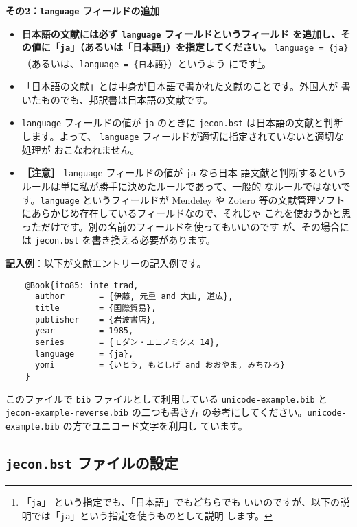 \documentclass[a4paper,10pt]{bxjsarticle}
\begin{document}
\textbf{その2：\texttt{language} フィールドの追加}
\begin{itemize}
 \item \textbf{日本語の文献には必ず \texttt{language} フィールドというフィールド
       を追加し、その値に「\texttt{ja}」（あるいは「日本語」）を指定してください。}
       \verb|language = {ja}| （あるいは、\verb|language = {日本語}|）というよう
       にです\footnote{「\texttt{ja}」 という指定でも、「日本語」でもどちらでも
       いいのですが、以下の説明では「\texttt{ja}」という指定を使うものとして説明
       します。}。
 \item 「日本語の文献」とは中身が日本語で書かれた文献のことです。外国人が
       書いたものでも、邦訳書は日本語の文献です。
 \item \texttt{language} フィールドの値が \texttt{ja} のときに
       \texttt{jecon.bst} は日本語の文献と判断します。よって、
       \texttt{language} フィールドが適切に指定されていないと適切な処理が
       おこなわれません。
 \item \textbf{［注意］} \texttt{language} フィールドの値が \texttt{ja} なら日本
       語文献と判断するというルールは単に私が勝手に決めたルールであって、一般的
       なルールではないです。\texttt{language} というフィールドが Mendeley や
       Zotero 等の文献管理ソフトにあらかじめ存在しているフィールドなので、それじゃ
       これを使おうかと思っただけです。別の名前のフィールドを使ってもいいのです
       が、その場合には \texttt{jecon.bst} を書き換える必要があります。
\end{itemize}

\vspace*{1em}

\textbf{記入例}：以下が文献エントリーの記入例です。
\begin{verbatim}
    @Book{ito85:_inte_trad,
      author       = {伊藤, 元重 and 大山, 道広},
      title        = {国際貿易},
      publisher    = {岩波書店},
      year         = 1985,
      series       = {モダン・エコノミクス 14},
      language     = {ja},
      yomi         = {いとう, もとしげ and おおやま, みちひろ}
    }
\end{verbatim}

このファイルで \texttt{bib} ファイルとして利用している
\texttt{unicode-example.bib} と \texttt{jecon-example-reverse.bib} の二つも書き方
の参考にしてください。\texttt{unicode-example.bib} の方でユニコード文字を利用し
ています。

\subsection{\texttt{jecon.bst} ファイルの設定}
\end{document}
